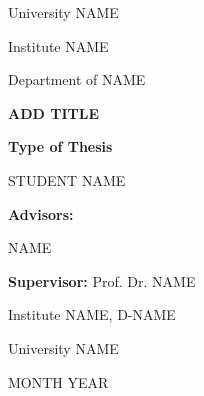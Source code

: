 \begin{titlepage}

    \begin{figure}[h]
    \end{figure}
    
    \begin{center}
        
        \vfill
        
        University NAME
        
        Institute NAME
        
        Department of NAME
        
        \vfill
        
        \textbf{\Large ADD TITLE}
        
        \vfill
        
        \textbf{Type of Thesis}
        
        \vfill
        STUDENT NAME
        
        \vfill
        
        \textbf{Advisors:}
        
        NAME
        
        \vfill
        
        \textbf{Supervisor:}
        Prof. Dr. NAME
        
        Institute NAME, D-NAME
        
        University NAME
        
        \vfill
        
        MONTH YEAR
        \vfill
    
    \end{center}
\end{titlepage}